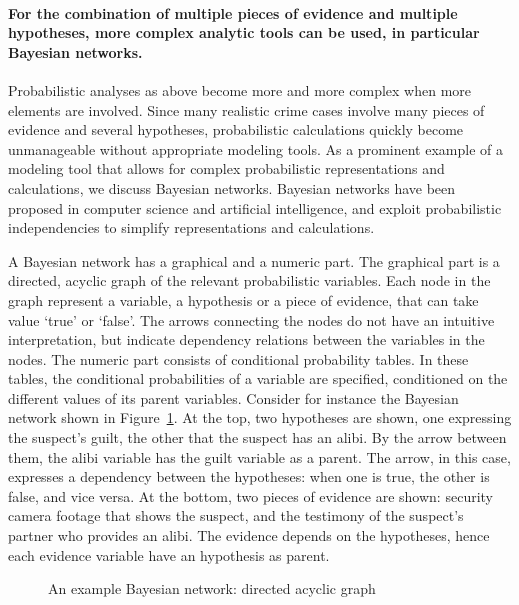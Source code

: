 \documentclass[10pt]{article}
\begin{document}
\paragraph{For the combination of multiple pieces of evidence and multiple hypotheses, more complex analytic tools can be used, in particular Bayesian networks.} Probabilistic analyses as above become more and more complex when more elements are involved. Since many realistic crime cases involve many pieces of evidence and several hypotheses, probabilistic calculations quickly become unmanageable without appropriate modeling tools. As a prominent example of a modeling tool that allows for complex probabilistic representations and calculations, we discuss Bayesian networks. Bayesian networks have been proposed in computer science and artificial intelligence, and exploit probabilistic independencies to simplify representations and calculations.

A Bayesian network has a graphical and a numeric part. The graphical part is a directed, acyclic graph of the relevant probabilistic variables. 
Each node in the graph represent a variable, a hypothesis or a piece of evidence, that 
can take value `true' or `false'. 
The arrows connecting the nodes do not have an intuitive interpretation, 
but indicate dependency relations between the variables in the nodes. 
The numeric part consists of conditional probability tables. In these tables, the conditional probabilities of a variable are specified, conditioned on the different values of its parent variables. Consider for instance the Bayesian network shown in Figure~\ref{fig:BN}. At the top, two hypotheses are shown, one expressing the suspect's guilt, the other that the suspect has an alibi. By the arrow between them, the alibi variable has the guilt variable as a parent. The arrow, in this case, expresses a dependency between the hypotheses: when one is true, the other is false, and vice versa. At the bottom, two pieces of evidence are shown: security camera footage that shows the suspect, and the testimony of the suspect's partner who provides an alibi. The evidence depends on the hypotheses, 
hence each evidence variable have an hypothesis as parent. 

\begin{figure}[t]
\centering

\caption{An example Bayesian network: directed acyclic graph\label{fig:BN}}
\end{figure}
\end{document}
